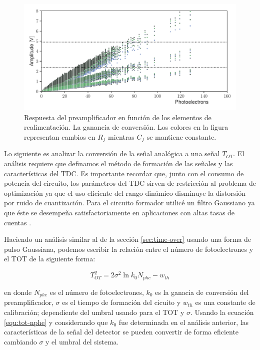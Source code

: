 \begin{figure}
        \centering
        \includegraphics[width=\textwidth]{phe-cal.pdf}
        \caption{Respuesta del preamplificador en función de los elementos de realimentación. La ganancia de conversión. Los colores en la figura representan cambios en $R_{f}$ mientras $C_{f}$ se mantiene constante.}
        \label{fig:phe-cal}
\end{figure}

Lo siguiente es analizar la conversión de la señal analógica a una señal $T_{OT}$. El análisis requiere que definamos el método de formación de las señales y las características del TDC. Es importante recordar que,  junto con el consumo de potencia del circuito, los parámetros del TDC sirven de restricción al problema de optimización ya que el uso eficiente del rango dinámico disminuye la distorsión por ruido de cuantización. Para el circuito formador utilicé un filtro Gaussiano ya que éste se desempeña satisfactoriamente en aplicaciones con altas tasas de cuentas \cite{ohkawa76}.

Haciendo un análisis similar al de la sección \ref{sec:time-over} usando una forma de pulso Gaussiana, podemos escribir la relación entre el número de fotoelectrones y el TOT de la siguiente forma:

\begin{equation}
\label{equ:tot-nphe}
T_{OT}^{2}=2\sigma^{2}\ln{k_{0} N_{phe}}-w_{th}
\end{equation}

en donde $N_{phe}$ es el número de fotoelectrones, $k_{0}$ es la ganacia de conversión del preamplificador, $\sigma$ es el tiempo de formación del cicuito y $w_{th}$ es una constante de calibración; dependiente del umbral usando para el TOT y $\sigma$. Usando la ecuación \ref{equ:tot-nphe} y considerando que $k_{0}$ fue determinada en el análisis anterior, las características de la señal del detector se pueden convertir de forma eficiente cambiando $\sigma$ y el umbral del sistema.

